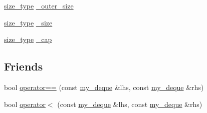 \begin{DoxyCompactItemize}
\item 
\hyperlink{classmy__deque_a61e5e5317fe72a381ce4d45f09544b02}{size\-\_\-type} \hyperlink{classmy__deque_acc99670ac05b126e60a9f618464f447e}{\-\_\-outer\-\_\-size}
\item 
\hyperlink{classmy__deque_a61e5e5317fe72a381ce4d45f09544b02}{size\-\_\-type} \hyperlink{classmy__deque_a09ccb24518345bf20902896ebcdffd33}{\-\_\-size}
\item 
\hyperlink{classmy__deque_a61e5e5317fe72a381ce4d45f09544b02}{size\-\_\-type} \hyperlink{classmy__deque_af094477b579ee653b6e11097611952a3}{\-\_\-cap}
\end{DoxyCompactItemize}
\subsection*{Friends}
\begin{DoxyCompactItemize}
\item 
bool \hyperlink{classmy__deque_aca1e37552707f9d7710a6af82cf1262e}{operator==} (const \hyperlink{classmy__deque}{my\-\_\-deque} \&lhs, const \hyperlink{classmy__deque}{my\-\_\-deque} \&rhs)
\item 
bool \hyperlink{classmy__deque_abd32df1d76a0ab0c1519f65cc4fa1363}{operator$<$} (const \hyperlink{classmy__deque}{my\-\_\-deque} \&lhs, const \hyperlink{classmy__deque}{my\-\_\-deque} \&rhs)
\end{DoxyCompactItemize}


